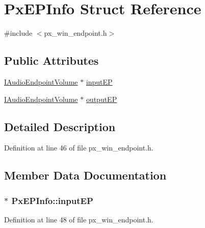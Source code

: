 \hypertarget{struct_px_e_p_info}{}\section{Px\+E\+P\+Info Struct Reference}
\label{struct_px_e_p_info}


{\ttfamily \#include $<$px\+\_\+win\+\_\+endpoint.\+h$>$}

\subsection*{Public Attributes}
\begin{DoxyCompactItemize}
\item 
\hyperlink{endpointvolume_8h_a0aa518a24cb3834bf372f46cfc94e3cf}{I\+Audio\+Endpoint\+Volume} $\ast$ \hyperlink{struct_px_e_p_info_a65a5c4929d34d3c0870d4b75f8f80a21}{input\+EP}
\item 
\hyperlink{endpointvolume_8h_a0aa518a24cb3834bf372f46cfc94e3cf}{I\+Audio\+Endpoint\+Volume} $\ast$ \hyperlink{struct_px_e_p_info_ae184a60f3cd2bb5bb2c83f91bb8a95a4}{output\+EP}
\end{DoxyCompactItemize}


\subsection{Detailed Description}


Definition at line 46 of file px\+\_\+win\+\_\+endpoint.\+h.



\subsection{Member Data Documentation}
\subsubsection[{\texorpdfstring{input\+EP}{inputEP}}]{$\ast$ Px\+E\+P\+Info\+::input\+EP}\hypertarget{struct_px_e_p_info_a65a5c4929d34d3c0870d4b75f8f80a21}{}\label{struct_px_e_p_info_a65a5c4929d34d3c0870d4b75f8f80a21}


Definition at line 48 of file px\+\_\+win\+\_\+endpoint.\+h.

